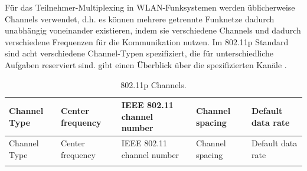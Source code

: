 \documentclass[ngerman,]{scrartcl}
\begin{document}
Für das Teilnehmer-Multiplexing in WLAN-Funksystemen werden
üblicherweise Channels verwendet, d.h. es können mehrere getrennte
Funknetze dadurch unabhängig voneinander existieren, indem sie
verschiedene Channels und dadurch verschiedene Frequenzen für die
Kommunikation nutzen. Im 802.11p Standard sind acht verschiedene
Channel-Typen spezifiziert, die für unterschiedliche Aufgaben reserviert
sind.  gibt einen Überblick über die
spezifizierten Kanäle \autocite{etsi}.

\begin{longtable}[]{@{}lllll@{}}
\caption{802.11p Channels. \label{tbl:channels}}\tabularnewline
\toprule
\begin{minipage}[b]{0.08\columnwidth}\raggedright\strut
Channel Type\strut
\end{minipage} & \begin{minipage}[b]{0.30\columnwidth}\raggedright\strut
Center frequency\strut
\end{minipage} & \begin{minipage}[b]{0.16\columnwidth}\raggedright\strut
IEEE 802.11 channel number\strut
\end{minipage} & \begin{minipage}[b]{0.14\columnwidth}\raggedright\strut
Channel spacing\strut
\end{minipage} & \begin{minipage}[b]{0.18\columnwidth}\raggedright\strut
Default data rate\strut
\end{minipage}\tabularnewline
\midrule
\endfirsthead
\toprule
\begin{minipage}[b]{0.08\columnwidth}\raggedright\strut
Channel Type\strut
\end{minipage} & \begin{minipage}[b]{0.30\columnwidth}\raggedright\strut
Center frequency\strut
\end{minipage} & \begin{minipage}[b]{0.16\columnwidth}\raggedright\strut
IEEE 802.11 channel number\strut
\end{minipage} & \begin{minipage}[b]{0.14\columnwidth}\raggedright\strut
Channel spacing\strut
\end{minipage} & \begin{minipage}[b]{0.18\columnwidth}\raggedright\strut
Default data rate\strut
\end{minipage}\tabularnewline
\midrule
\endhead
\begin{minipage}[t]{0.08\columnwidth}\raggedright\strut

\end{minipage}
\end{longtable}
\end{document}
